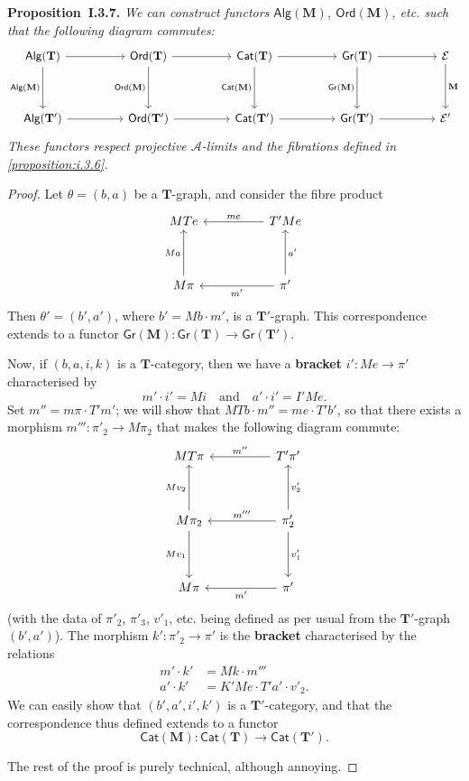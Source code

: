 \documentclass{article}
\newenvironment{itenv}[1]
  {\phantomsection\par\medskip\noindent\textbf{#1.}\itshape}
  {\par\medskip}
\newcommand{\oldpage}[1]{\marginpar{\footnotesize$\Big\vert$ \textit{p.~#1}}}
\newcommand{\unsure}[1]{{\color{purple}\textbf{#1}}}
\newcommand{\TT}{\mathbf{T}}
\newcommand{\MM}{\mathbf{M}}
\newcommand{\textand}{\quad\text{and}\quad}
\newcommand{\cat}[1]{\mathcal{#1}}
\newcommand{\Cat}[1]{\mathsf{#1}}
\newcommand{\Gr}[1]{\Cat{Gr}(#1)}
\newcommand{\Alg}[1]{\Cat{Alg}(#1)}
\newcommand{\Ord}[1]{\Cat{Ord}(#1)}
\begin{document}
\oldpage{237}
\begin{itenv}{Proposition~I.3.7}
  We can construct functors $\Alg{\MM}$, $\Ord{\MM}$, etc. such that the following diagram commutes:
  \[
    \begin{tikzcd}[sep=huge]
      \Alg{\TT}
        \ar[d,swap,"\Alg{\MM}"]
        \ar[r]
    & \Ord{\TT}
        \ar[d,swap,"\Ord{\MM}"]
        \ar[r]
    & \Cat{Cat}(\TT)
        \ar[d,swap,"\Cat{Cat}(\MM)"]
        \ar[r]
    & \Gr{\TT}
        \ar[d,swap,"\Gr{\MM}"]
        \ar[r]
    & \cat{E}
        \ar[d,"\MM"]
    \\\Alg{\TT'}
        \ar[r]
    & \Ord{\TT'}
        \ar[r]
    & \Cat{Cat}(\TT')
        \ar[r]
    & \Gr{\TT'}
        \ar[r]
    & \cat{E'}
    \end{tikzcd}
  \]
  These functors respect projective $\cat{A}$-limits and the fibrations defined in \cref{proposition:i.3.6}.
\end{itenv}

\begin{proof}
  Let $\theta=(b,a)$ be a $\TT$-graph, and consider the fibre product
  \[
    \begin{tikzcd}[sep=huge]
      MTe
    & T'Me
        \ar[l,swap,"me"]
    \\M\pi
        \ar[u,"Ma"]
    & \pi'
        \ar[l,"m'"]
        \ar[u,swap,"a'"]
    \end{tikzcd}
  \]
  Then $\theta'=(b',a')$, where $b'=Mb\cdot m'$, is a $\TT'$-graph.
  This correspondence extends to a functor $\Gr{\MM}\colon\Gr{\TT}\to\Gr{\TT'}$.

  Now, if $(b,a,i,k)$ is a $\TT$-category, then we have a \unsure{bracket} $i'\colon Me\to\pi'$ characterised by
  \[
    m'\cdot i' = Mi
    \textand
    a'\cdot i' = I'Me.
  \]
  Set $m''=m\pi\cdot T'm'$;
  we will show that $MTb\cdot m''=me\cdot T'b'$, so that there exists a morphism $m'''\colon\pi'_2\to M\pi_2$ that makes the following diagram commute:
  \[
    \begin{tikzcd}[sep=huge]
      MT\pi
    & T'\pi'
        \ar[l,swap,"m''"]
    \\M\pi_2
        \ar[u,"Mv_2"]
        \ar[d,swap,"Mv_1"]
    & \pi'_2
        \ar[u,swap,"v'_2"]
        \ar[l,swap,"m'''"]
        \ar[d,"v'_1"]
    \\M\pi
    & \pi'
        \ar[l,"m'"]
    \end{tikzcd}
  \]
  (with the data of $\pi'_2$, $\pi'_3$, $v'_1$, etc. being defined as per usual from the $\TT'$-graph $(b',a')$).
  The morphism $k'\colon\pi'_2\to\pi'$ is the \unsure{bracket} characterised by the relations
  \[
    \begin{aligned}
      m'\cdot k'
    & = Mk\cdot m'''
    \\a'\cdot k'
    & = K'Me\cdot T'a'\cdot v'_2.
    \end{aligned}
  \]
  \oldpage{238}
  We can easily show that $(b',a',i',k')$ is a $\TT'$-category, and that the correspondence thus defined extends to a functor
  \[
    \Cat{Cat}(\MM)\colon \Cat{Cat}(\TT)\to\Cat{Cat}(\TT').
  \]

  The rest of the proof is purely technical, although annoying.
\end{proof}
\end{document}
